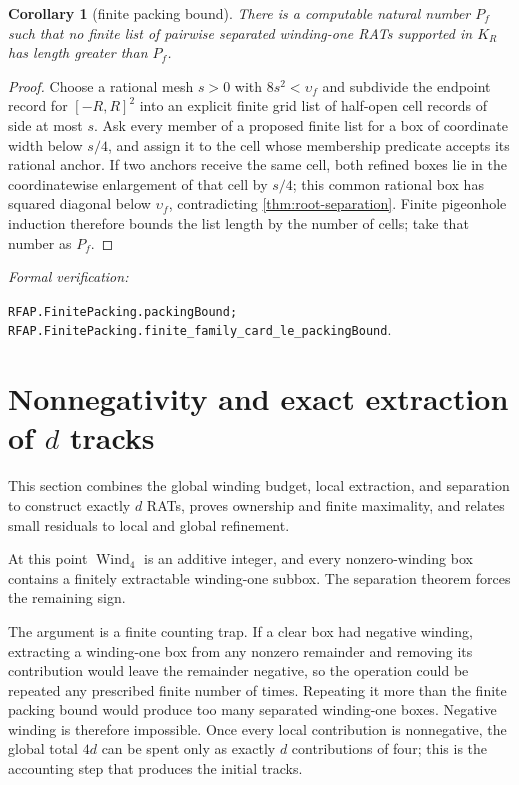 \documentclass[11pt]{article}
\newtheorem{corollary}[theorem]{Corollary}
\newcommand{\Wind}{\operatorname{Wind}}
\newcommand{\leanref}[1]{\par\smallskip\noindent
  \emph{Formal verification:}\par\nobreak
  {\raggedright\nolinkurl{#1}.\par}}
\begin{document}
\begin{corollary}[finite packing bound]
\label{cor:packing}
There is a computable natural number $P_f$ such that no finite list of pairwise separated winding-one RATs supported in $K_R$ has length greater than $P_f$.
\end{corollary}

\begin{proof}
Choose a rational mesh $s>0$ with $8s^2<\upsilon_f$ and subdivide the
endpoint record for $[-R,R]^2$ into an explicit finite grid list of half-open
cell records of side at most $s$.  Ask every member of a proposed finite list
for a box of coordinate width below $s/4$, and assign it to the cell whose
membership predicate accepts its rational anchor.  If two anchors receive
the same cell, both refined boxes lie in the coordinatewise enlargement of
that cell by $s/4$; this common rational box has squared diagonal below
$\upsilon_f$, contradicting \cref{thm:root-separation}.  Finite pigeonhole
induction therefore bounds the list length by the number of cells; take that
number as $P_f$.
\end{proof}

\leanref{RFAP.FinitePacking.packingBound;
RFAP.FinitePacking.finite_family_card_le_packingBound}

\section{Nonnegativity and exact extraction of \texorpdfstring{$d$}{d} tracks}
\label{sec:exact-isolation}

This section combines the global winding budget, local extraction, and
separation to construct exactly $d$ RATs, proves ownership and finite
maximality, and relates small residuals to local and global refinement.

At this point $\Wind_4$ is an additive integer, and every nonzero-winding box
contains a finitely extractable winding-one subbox.  The separation
theorem forces the remaining sign.

The argument is a finite counting trap.  If a clear box had negative
winding, extracting a winding-one box from any nonzero remainder and removing its
contribution would leave the remainder negative, so the operation could be
repeated any prescribed finite number of times.  Repeating it more than the
finite packing bound would produce too many separated winding-one boxes.
Negative winding is therefore impossible.  Once every local contribution is
nonnegative, the global total $4d$ can be spent only as exactly $d$
contributions of four; this is the accounting step that produces the initial
tracks.
\end{document}
